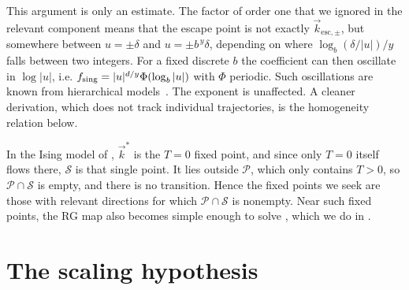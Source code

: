This argument is only an estimate. The factor of order one that we ignored in
the relevant component means that the escape point is not exactly
$\vec{k}_{\text{esc},\pm}$, but somewhere between $u=\pm\delta$ and
$u=\pm b^{\,y}\delta$, depending on where $\log_b(\delta/|u|)/y$ falls between
two integers. For a fixed discrete $b$ the coefficient can then oscillate in
$\log|u|$, i.e. $f_{\text{sing}}=|u|^{d/y}\Phi(\log_b|u|)$ with $\Phi$ periodic. Such
oscillations are known from hierarchical models~\cite{derrida_oscillatory_1984}.
The exponent is unaffected. A cleaner derivation, which does not track
individual trajectories, is the homogeneity relation
 below.

In the  Ising model of , $\vec{k}^*$ is the $T=0$
fixed point, and since only $T=0$ itself flows there, $\mathcal{S}$ is that single
point. It lies outside $\mathcal{P}$, which only contains $T>0$, so
$\mathcal{P}\cap\mathcal{S}$ is empty, and there is no transition. Hence the
fixed points we seek are those with relevant directions for which
$\mathcal{P}\cap\mathcal{S}$ is nonempty. Near such fixed points, the RG map also
becomes simple enough to solve , which we do in
.

\section{The scaling hypothesis}\label{sec:scalingHypothesis}

